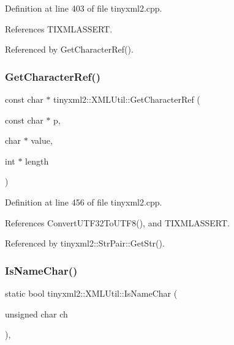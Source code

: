 Definition at line 403 of file tinyxml2.\+cpp.



References T\+I\+X\+M\+L\+A\+S\+S\+E\+RT.



Referenced by Get\+Character\+Ref().

\mbox{\label{classtinyxml2_1_1_x_m_l_util_a5a96e5144a8d693dc4bcd783d9964648}} 
\subsubsection{GetCharacterRef()}
{\footnotesize\ttfamily const char $\ast$ tinyxml2\+::\+X\+M\+L\+Util\+::\+Get\+Character\+Ref (\begin{DoxyParamCaption}\item[{const char $\ast$}]{p,  }\item[{char $\ast$}]{value,  }\item[{int $\ast$}]{length }\end{DoxyParamCaption})\hspace{0.3cm}{\ttfamily [static]}}



Definition at line 456 of file tinyxml2.\+cpp.



References Convert\+U\+T\+F32\+To\+U\+T\+F8(), and T\+I\+X\+M\+L\+A\+S\+S\+E\+RT.



Referenced by tinyxml2\+::\+Str\+Pair\+::\+Get\+Str().

\mbox{\label{classtinyxml2_1_1_x_m_l_util_a04b17341538fa11752f24b4301d19485}} 
\subsubsection{IsNameChar()}
{\footnotesize\ttfamily static bool tinyxml2\+::\+X\+M\+L\+Util\+::\+Is\+Name\+Char (\begin{DoxyParamCaption}\item[{unsigned char}]{ch }\end{DoxyParamCaption})\hspace{0.3cm}{\ttfamily [inline]}, {\ttfamily [static]}}



